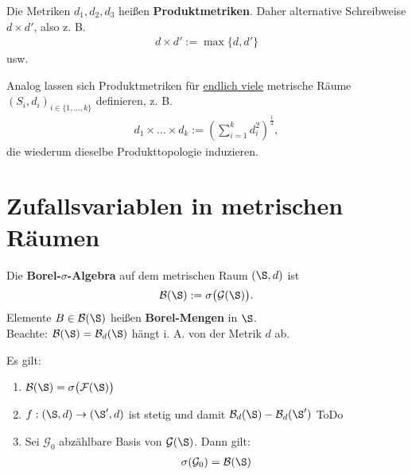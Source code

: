\begin{defi}
Die Metriken $d_1,d_2,d_3$ heißen \textbf{Produktmetriken}. Daher alternative Schreibweise $d\times d'$, also z. B. 
\begin{align*}
d\times d':=\max\lbrace d,d'\rbrace
\end{align*}
usw.
\end{defi}

\begin{bemerkungnr} %
Analog lassen sich Produktmetriken für \underline{endlich viele} metrische Räume $(S_i,d_i)_{i\in\lbrace1,\ldots,k\rbrace}$ definieren, z. B.
\begin{align*}
d_1\times\ldots\times d_k:=\left(\sum\limits_{i=1}^k d_i^2\right)^{\frac{1}{2}},
\end{align*}
die wiederum dieselbe Produkttopologie induzieren.
\end{bemerkungnr}

\section{Zufallsvariablen in metrischen Räumen}
\begin{definition} %
Die \textbf{Borel-$\sigma$-Algebra} auf dem metrischen Raum $(\S,d)$ ist %
\begin{align*}
\B(\S):=\sigma\big(\mathcal{G}(\S)\big).
\end{align*}
Elemente $B\in\B(\S)$ heißen \textbf{Borel-Mengen} in $\S$.\\
Beachte: $\B(\S)=\B_d(\S)$ hängt i. A. von der Metrik $d$ ab.
\end{definition}

\begin{lemma}\label{Lemma3.2} %
Es gilt:
\begin{enumerate}[label=(\arabic*)]
\item 
$\begin{aligned}
\B(\S)=\sigma\big(\mathcal{F}(\S)\big)
\end{aligned}$
\item $\begin{aligned}
f:(\S,d)\to(\S',d)
\end{aligned}$ ist stetig und damit $\B_d(\S)-\B_d(\S')$ ToDo
\item Sei $\mathcal{G}_0$ abzählbare Basis von $\mathcal{G}(\S)$. Dann gilt:
\begin{align*}
\sigma(\mathcal{G}_0)=\B(\S)
\end{align*}
\end{enumerate}
\end{lemma}

